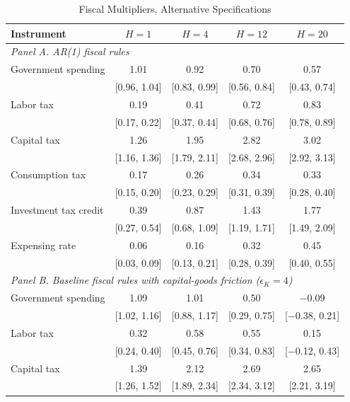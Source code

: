 \begin{table}[ht]
\centering
\caption{Fiscal Multipliers, Alternative Specifications}
\label{tab:mult_alt}
\begin{tabular}{lcccc}
\hline\hline
Instrument & $H=1$ & $H=4$ & $H=12$ & $H=20$ \\
\hline
\multicolumn{5}{l}{\textit{Panel A. AR(1) fiscal rules}} \\
Government spending      & 1.01 & 0.92 & 0.70 & 0.57 \\
                         & [0.96, 1.04] & [0.83, 0.99] & [0.56, 0.84] & [0.43, 0.74] \\
Labor tax                & 0.19 & 0.41 & 0.72 & 0.83 \\
                         & [0.17, 0.22] & [0.37, 0.44] & [0.68, 0.76] & [0.78, 0.89] \\
Capital tax              & 1.26 & 1.95 & 2.82 & 3.02 \\
                         & [1.16, 1.36] & [1.79, 2.11] & [2.68, 2.96] & [2.92, 3.13] \\
Consumption tax          & 0.17 & 0.26 & 0.34 & 0.33 \\
                         & [0.15, 0.20] & [0.23, 0.29] & [0.31, 0.39] & [0.28, 0.40] \\
Investment tax credit    & 0.39 & 0.87 & 1.43 & 1.77 \\
                         & [0.27, 0.54] & [0.68, 1.09] & [1.19, 1.71] & [1.49, 2.09] \\
Expensing rate           & 0.06 & 0.16 & 0.32 & 0.45 \\
                         & [0.03, 0.09] & [0.13, 0.21] & [0.28, 0.39] & [0.40, 0.55] \\
\hline
\multicolumn{5}{l}{\textit{Panel B. Baseline fiscal rules with capital-goods friction ($\epsilon_K = 4$)}} \\
Government spending      & 1.09 & 1.01 & 0.50 & $-$0.09 \\
                         & [1.02, 1.16] & [0.88, 1.17] & [0.29, 0.75] & [$-$0.38, 0.21] \\
Labor tax                & 0.32 & 0.58 & 0.55 & 0.15 \\
                         & [0.24, 0.40] & [0.45, 0.76] & [0.34, 0.83] & [$-$0.12, 0.43] \\
Capital tax              & 1.39 & 2.12 & 2.69 & 2.65 \\
                         & [1.26, 1.52] & [1.89, 2.34] & [2.34, 3.12] & [2.21, 3.19] \\

\end{tabular}
\end{table}
